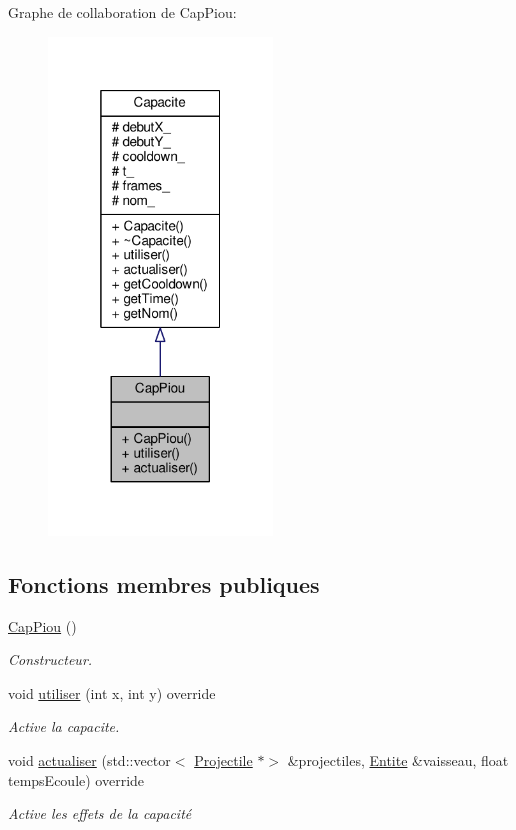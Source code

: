 Graphe de collaboration de Cap\+Piou\+:\nopagebreak
\begin{figure}[H]
\begin{center}
\leavevmode
\includegraphics[width=169pt]{class_cap_piou__coll__graph}
\end{center}
\end{figure}
\subsection*{Fonctions membres publiques}
\begin{DoxyCompactItemize}
\item 
\hyperlink{class_cap_piou_aa2ed61fb1313a447cf8444399001750d}{Cap\+Piou} ()
\begin{DoxyCompactList}\small\item\em Constructeur. \end{DoxyCompactList}\item 
void \hyperlink{class_cap_piou_aad0eb3b9fab67785e1d0441b96aa921f}{utiliser} (int x, int y) override
\begin{DoxyCompactList}\small\item\em Active la capacite. \end{DoxyCompactList}\item 
void \hyperlink{class_cap_piou_a0823f301d48377ca2e14a0cd17922716}{actualiser} (std\+::vector$<$ \hyperlink{class_projectile}{Projectile} $\ast$$>$ \&projectiles, \hyperlink{class_entite}{Entite} \&vaisseau, float temps\+Ecoule) override
\begin{DoxyCompactList}\small\item\em Active les effets de la capacité \end{DoxyCompactList}\end{DoxyCompactItemize}
